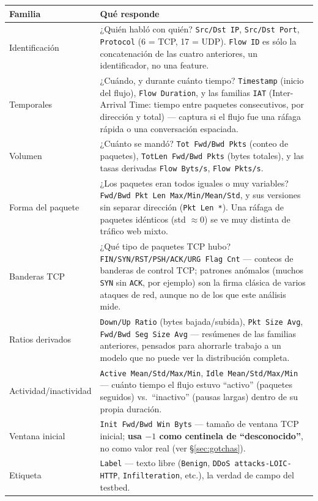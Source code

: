 \documentclass[11pt]{article}
\newcommand{\code}[1]{\texttt{\small #1}}
\begin{document}
\begin{center}
\begin{longtable}{@{}lp{10cm}@{}}
\toprule
\textbf{Familia} & \textbf{Qué responde} \\
\midrule
\endhead
Identificación & ¿Quién habló con quién? \code{Src/Dst IP}, \code{Src/Dst Port},
  \code{Protocol} (6 = TCP, 17 = UDP). \code{Flow ID} es sólo la concatenación de las
  cuatro anteriores, un identificador, no una feature. \\
Temporales & ¿Cuándo, y durante cuánto tiempo? \code{Timestamp} (inicio del flujo),
  \code{Flow Duration}, y las familias \code{IAT} (Inter-Arrival Time: tiempo entre
  paquetes consecutivos, por dirección y total) --- captura si el flujo fue una ráfaga
  rápida o una conversación espaciada. \\
Volumen & ¿Cuánto se mandó? \code{Tot Fwd/Bwd Pkts} (conteo de paquetes),
  \code{TotLen Fwd/Bwd Pkts} (bytes totales), y las tasas derivadas
  \code{Flow Byts/s}, \code{Flow Pkts/s}. \\
Forma del paquete & ¿Los paquetes eran todos iguales o muy variables?
  \code{Fwd/Bwd Pkt Len Max/Min/Mean/Std}, y sus versiones sin separar dirección
  (\code{Pkt Len *}). Una ráfaga de paquetes idénticos (std $\approx$0) se ve muy distinta
  de tráfico web mixto. \\
Banderas TCP & ¿Qué tipo de paquetes TCP hubo? \code{FIN/SYN/RST/PSH/ACK/URG Flag Cnt}
  --- conteos de banderas de control TCP; patrones anómalos (muchos \code{SYN} sin
  \code{ACK}, por ejemplo) son la firma clásica de varios ataques de red, aunque no de
  los que este análisis mide. \\
Ratios derivados & \code{Down/Up Ratio} (bytes bajada/subida), \code{Pkt Size Avg},
  \code{Fwd/Bwd Seg Size Avg} --- resúmenes de las familias anteriores, pensados para
  ahorrarle trabajo a un modelo que no puede ver la distribución completa. \\
Actividad/inactividad & \code{Active Mean/Std/Max/Min}, \code{Idle Mean/Std/Max/Min} ---
  cuánto tiempo el flujo estuvo ``activo'' (paquetes seguidos) vs.\ ``inactivo'' (pausas
  largas) dentro de su propia duración. \\
Ventana inicial & \code{Init Fwd/Bwd Win Byts} --- tamaño de ventana TCP inicial;
  \textbf{usa $-1$ como centinela de ``desconocido''}, no como valor real (ver
  \S\ref{sec:gotchas}). \\
Etiqueta & \code{Label} --- texto libre (\code{Benign}, \code{DDoS attacks-LOIC-HTTP},
  \code{Infilteration}, etc.), la verdad de campo del testbed. \\
\bottomrule
\end{longtable}
\end{center}
\end{document}
